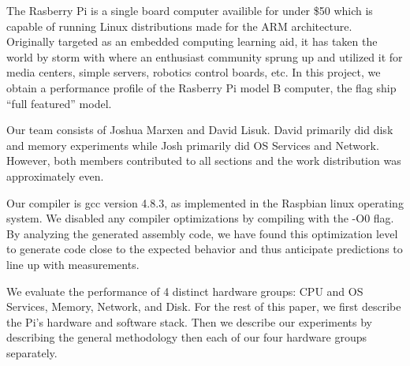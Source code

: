 The Rasberry Pi is a single board computer availible for under \$50 which is capable of running Linux distributions made for the ARM architecture.  
Originally targeted as an embedded computing learning aid, it has taken the world by storm with where an enthusiast community sprung up and utilized it for media centers, simple servers, robotics control boards, etc.
In this project, we obtain a performance profile of the Rasberry Pi model B computer, the flag ship ``full featured'' model.

Our team consists of Joshua Marxen and David Lisuk. 
David primarily did disk and memory experiments while Josh primarily did OS Services and Network.
However, both members contributed to all sections and the work distribution was approximately even.

Our compiler is gcc version 4.8.3, as implemented in the Raspbian linux operating system.
We disabled any compiler optimizations by compiling with the -O0 flag.
By analyzing the generated assembly code, we have found this optimization level to generate code close to the expected behavior and thus anticipate predictions to line up with measurements.

We evaluate the performance of 4 distinct hardware groups: CPU and OS Services, Memory, Network, and Disk.
For the rest of this paper, we first describe the Pi's hardware and software stack.
Then we describe our experiments by describing the general methodology then each of our four hardware groups separately.